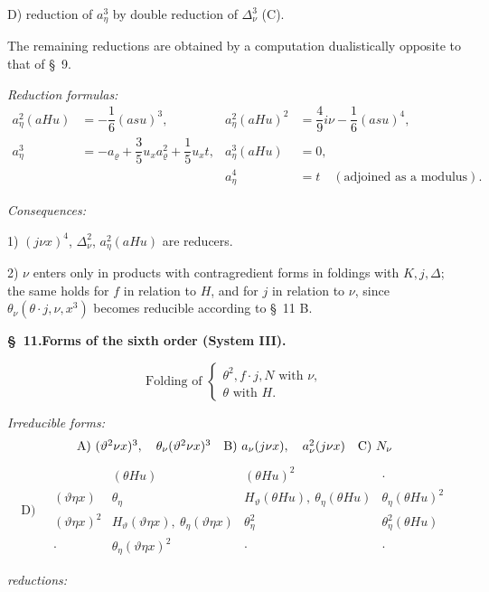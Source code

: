 \documentclass[11pt]{article}
\newcommand{\A}{\Delta}
\newcommand{\R}{\varrho}
\begin{document}
\noindent D) reduction of $a_\eta^3$ by double reduction of $\A_\nu^3$ (C).

The remaining reductions are obtained by a computation dualistically opposite to that of \S\ 9.

\noindent\emph{Reduction formulas:}
\[
\tag{11}
\begin{array}{rl|rl}
a_\eta^2(aHu)&=-\dfrac16(asu)^3,&
 a_\eta^2(aHu)^2&=\dfrac49 i\nu-\dfrac16(asu)^4,\\[0.7em]
a_\eta^3&=-a_\R+\dfrac35u_xa_\R^2+\dfrac15u_xt,
& a_\eta^3(aHu)&=0,\\[0.7em]
&&a_\eta^4&=t\quad(\text{adjoined as a modulus}).
\end{array}
\]

\noindent\emph{Consequences:}

1) $(j\nu x)^4$, $\A_\nu^2$, $a_\eta^2(aHu)$ are reducers.

2) $\nu$ enters only in products with contragredient forms in foldings with $K,j,\A$; the same holds for $f$ in relation to $H$, and for $j$ in relation to $\nu$, since $\theta_\nu(\theta\cdot j,\nu,x^3)$ becomes reducible according to \S\ 11 B.

\begin{center}
\textbf{\S\ 11.\quad Forms of the sixth order (System III).}
\end{center}
\[
\text{Folding of }\left\{\begin{array}{l}
\theta^2,
 f\cdot j,
 N \text{ with }\nu,\\
\theta\text{ with }H.
\end{array}\right.
\]

\noindent\emph{Irreducible forms:}
\[
\begin{array}{c@{\quad}c@{\quad}c}
\text{A)}\ (\vartheta^2\nu x)^3,\quad \theta_\nu(\vartheta^2\nu x)^3
&
\text{B)}\ a_\nu(j\nu x),\quad a_\nu^2(j\nu x)
&
\text{C)}\ N_\nu
\end{array}
\]
\[
\text{D)}\quad
\begin{array}{c|c|c|c}
 & (\theta Hu)&(\theta Hu)^2&\cdot\\
(\vartheta\eta x)&\theta_\eta&H_\vartheta(\theta Hu),\ \theta_\eta(\theta Hu)&\theta_\eta(\theta Hu)^2\\
(\vartheta\eta x)^2&H_\vartheta(\vartheta\eta x),\ \theta_\eta(\vartheta\eta x)&\theta_\eta^2&\theta_\eta^2(\theta Hu)\\
\cdot&\theta_\eta(\vartheta\eta x)^2&\cdot&\cdot
\end{array}
\]

\noindent\emph{reductions:}
\end{document}
